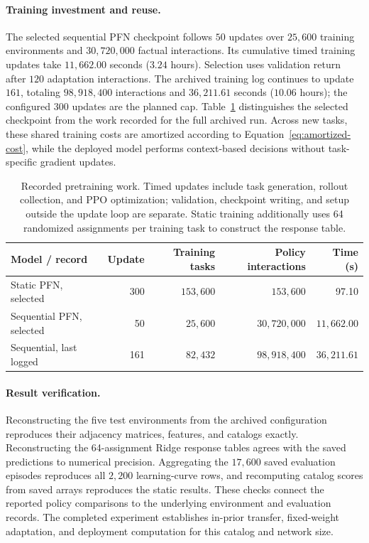 \documentclass[a4paper,11pt]{article}
\numberwithin{equation}{section}
\begin{document}
\paragraph{Training investment and reuse.}
The selected sequential PFN checkpoint follows $50$ updates over $25{,}600$ training environments and $30{,}720{,}000$ factual interactions. Its cumulative timed training updates take $11{,}662.00$ seconds ($3.24$ hours). Selection uses validation return after $120$ adaptation interactions. The archived training log continues to update $161$, totaling $98{,}918{,}400$ interactions and $36{,}211.61$ seconds ($10.06$ hours); the configured $300$ updates are the planned cap. Table~\ref{tab:training-cost} distinguishes the selected checkpoint from the work recorded for the full archived run. Across new tasks, these shared training costs are amortized according to Equation~\eqref{eq:amortized-cost}, while the deployed model performs context-based decisions without task-specific gradient updates.

\begin{table}[htbp]
\centering\small
\caption{Recorded pretraining work. Timed updates include task generation, rollout collection, and PPO optimization; validation, checkpoint writing, and setup outside the update loop are separate. Static training additionally uses 64 randomized assignments per training task to construct the response table.}
\label{tab:training-cost}
\begin{tabular*}{\textwidth}{@{\extracolsep{\fill}}lrrrr@{}}
\toprule Model / record & Update & Training tasks & Policy interactions & Time (s)\\\midrule
Static PFN, selected & 300 & $153{,}600$ & $153{,}600$ & 97.10\\
Sequential PFN, selected & 50 & $25{,}600$ & $30{,}720{,}000$ & $11{,}662.00$\\
Sequential, last logged & 161 & $82{,}432$ & $98{,}918{,}400$ & $36{,}211.61$\\
\bottomrule
\end{tabular*}
\end{table}

\paragraph{Result verification.}
Reconstructing the five test environments from the archived configuration reproduces their adjacency matrices, features, and catalogs exactly. Reconstructing the 64-assignment Ridge response tables agrees with the saved predictions to numerical precision. Aggregating the $17{,}600$ saved evaluation episodes reproduces all $2{,}200$ learning-curve rows, and recomputing catalog scores from saved arrays reproduces the static results. These checks connect the reported policy comparisons to the underlying environment and evaluation records. The completed experiment establishes in-prior transfer, fixed-weight adaptation, and deployment computation for this catalog and network size.
\end{document}
